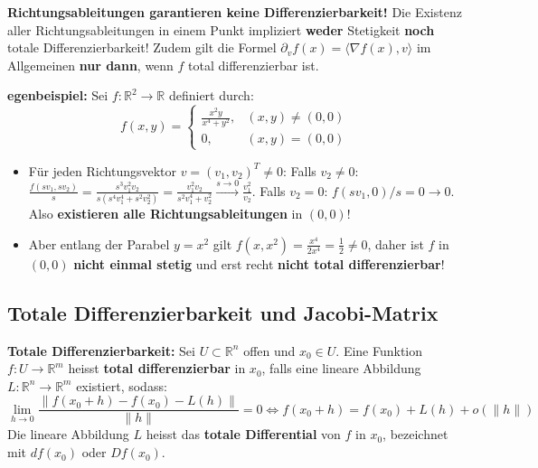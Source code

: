 \begin{remark}
    \textbf{Richtungsableitungen garantieren keine Differenzierbarkeit!}
    Die Existenz aller Richtungsableitungen in einem Punkt impliziert \textbf{weder} Stetigkeit \textbf{noch} totale Differenzierbarkeit! Zudem gilt die Formel $\partial_v f(x) = \langle \nabla f(x), v \rangle$ im Allgemeinen \textbf{nur dann}, wenn $f$ total differenzierbar ist.
    
    \textbf{egenbeispiel:} Sei $f: \mathbb{R}^2 \to \mathbb{R}$ definiert durch:
    $$ f(x, y) = \begin{cases} \frac{x^2 y}{x^4 + y^2}, & (x, y) \neq (0, 0) \\ 0, & (x, y) = (0, 0) \end{cases} $$
    \begin{itemize}
        \item Für jeden Richtungsvektor $v = (v_1, v_2)^T \neq 0$:
        Falls $v_2 \neq 0$: $\frac{f(s v_1, s v_2)}{s} = \frac{s^3 v_1^2 v_2}{s (s^4 v_1^4 + s^2 v_2^2)} = \frac{v_1^2 v_2}{s^2 v_1^4 + v_2^2} \xrightarrow{s \to 0} \frac{v_1^2}{v_2}$.
        Falls $v_2 = 0$: $f(s v_1, 0) / s = 0 \to 0$.
        Also \textbf{existieren alle Richtungsableitungen} in $(0, 0)$!
        \item Aber entlang der Parabel $y = x^2$ gilt $f(x, x^2) = \frac{x^4}{2x^4} = \frac{1}{2} \neq 0$, daher ist $f$ in $(0, 0)$ \textbf{nicht einmal stetig} und erst recht \textbf{nicht total differenzierbar}!
    \end{itemize}
\end{remark}

\subsection{Totale Differenzierbarkeit und Jacobi-Matrix}

\begin{definition}
    \textbf{Totale Differenzierbarkeit:} Sei $U \subset \mathbb{R}^n$ offen und $x_0 \in U$. Eine Funktion $f: U \to \mathbb{R}^m$ heisst \textbf{total differenzierbar} in $x_0$, falls eine lineare Abbildung $L: \mathbb{R}^n \to \mathbb{R}^m$ existiert, sodass:
    $$ \lim_{h \to 0} \frac{\|f(x_0 + h) - f(x_0) - L(h)\|}{\|h\|} = 0 \iff f(x_0 + h) = f(x_0) + L(h) + o(\|h\|) $$
    Die lineare Abbildung $L$ heisst das \textbf{totale Differential} von $f$ in $x_0$, bezeichnet mit $df(x_0)$ oder $Df(x_0)$.
\end{definition}

